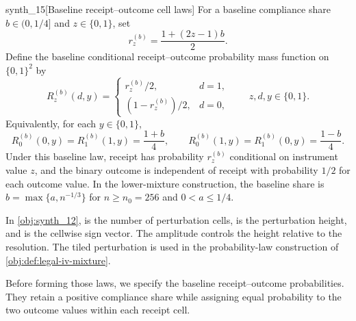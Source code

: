 \documentclass[11pt]{article}
\begin{document}
\begin{definitionv}{synth_15}[Baseline receipt–outcome cell laws]
For a baseline compliance share \(b\in(0,1/4]\) and \(z\in\{0,1\}\), set
\[
r_z^{(b)}=\frac{1+(2z-1)b}{2}.
\]
Define the baseline conditional receipt–outcome probability mass function on \(\{0,1\}^2\) by
\[
R_z^{(b)}(d,y)=
\begin{cases}
r_z^{(b)}/2,&d=1,\\
(1-r_z^{(b)})/2,&d=0,
\end{cases}
\qquad z,d,y\in\{0,1\}.
\]
Equivalently, for each \(y\in\{0,1\}\),
\[
R_0^{(b)}(0,y)=R_1^{(b)}(1,y)=\frac{1+b}{4},
\qquad
R_0^{(b)}(1,y)=R_1^{(b)}(0,y)=\frac{1-b}{4}.
\]
Under this baseline law, receipt has probability \(r_z^{(b)}\) conditional on instrument value \(z\), and the binary outcome is independent of receipt with probability \(1/2\) for each outcome value. In the lower-mixture construction, the baseline share is \(b=\max\{a,n^{-1/3}\}\) for \(n\ge n_0=256\) and \(0<a\le1/4\).
\end{definitionv}

In \cref{obj:synth_12},  is the number of perturbation cells,  is the perturbation height, and  is the cellwise sign vector. The amplitude  controls the height relative to the resolution. The tiled perturbation  is used in the probability-law construction of \cref{obj:def:legal-iv-mixture}.

Before forming those laws, we specify the baseline receipt--outcome probabilities. They retain a positive compliance share while assigning equal probability to the two outcome values within each receipt cell.
\end{document}

